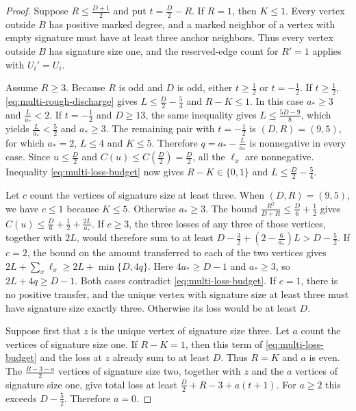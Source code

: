\documentclass[preprint,11pt,numbers]{elsarticle-arxiv}
\numberwithin{equation}{section}
\theoremstyle{definition}
\begin{document}
\begin{proof}
Suppose $R\le\frac{D+1}{2}$ and put $t=\frac{D}{2}-R$.
If $R=1$, then $K\le1$. Every vertex outside $B$ has positive
marked degree, and a marked neighbor of a vertex with empty
signature must have at least three anchor neighbors. Thus every
vertex outside $B$ has signature size one, and the reserved-edge
count for $R'=1$ applies with $U_i'=U_i$.

Assume $R\ge3$. Because $R$ is odd and $D$ is odd, either
$t\ge\frac{1}{2}$ or $t=-\frac{1}{2}$. If $t\ge\frac{1}{2}$,
\eqref{eq:multi-rough-discharge} gives
$L\le\frac{D}{2}-\frac{5}{4}$ and $R-K\le1$. In this case
$a_*\ge3$ and $\frac{L}{a_*}<2$. If $t=-\frac{1}{2}$ and
$D\ge13$, the same inequality gives $L\le\frac{5D-9}{8}$,
which yields $\frac{L}{a_*}<\frac{5}{2}$ and $a_*\ge3$.
The remaining pair with $t=-\frac{1}{2}$ is $(D,R)=(9,5)$,
for which $a_*=2$, $L\le4$ and $K\le5$. Therefore
$q=a_*-\frac{L}{a_*}$ is nonnegative in every case. Since
$u\le\frac{D}{2}$ and $C(u)\le C(\frac{D}{2})=\frac{D}{2}$,
all the $\ell_x$ are nonnegative. Inequality
\eqref{eq:multi-loss-budget} now gives $R-K\in\{0,1\}$ and
$L\le\frac{D}{2}-\frac{5}{4}$.

Let $c$ count the vertices of signature size at least three.
When $(D,R)=(9,5)$, we have $c\le1$ because $K\le5$.
Otherwise $a_*\ge3$. The bound
$\frac{R^2}{D+R}\le\frac{D}{6}+\frac{1}{2}$ gives
$C(u)\le\frac{D}{6}+\frac{1}{2}+\frac{2L}{a_*}$.
If $c\ge3$, the three losses of any three of those vertices,
together with $2L$, would therefore sum to at least
$D-\frac{3}{2}+(2-\frac{6}{a_*})L>D-\frac{5}{2}$.
If $c=2$, the bound on the amount transferred to each of the
two vertices gives $2L+\sum_x\ell_x\ge 2L+\min\{D,4q\}$.
Here $4a_*\ge D-1$ and $a_*\ge3$, so
$2L+4q\ge D-1$. Both cases contradict
\eqref{eq:multi-loss-budget}. If $c=1$, there is no
positive transfer, and the unique vertex with signature size at least
three must have signature size exactly three. Otherwise its loss
would be at least $D$.

Suppose first that $z$ is the unique vertex of signature size three.
Let $a$ count the vertices of signature size one. If $R-K=1$,
then this term of \eqref{eq:multi-loss-budget} and the loss at
$z$ already sum to at least $D$. Thus $R=K$ and $a$ is even.
The $\frac{R-3-a}{2}$ vertices of signature size two, together
with $z$ and the $a$ vertices of signature size one, give
total loss at least $\frac{D}{2}+R-3+a(t+1)$. For $a\ge2$ this
exceeds $D-\frac{5}{2}$. Therefore $a=0$.


\end{proof}
\end{document}
